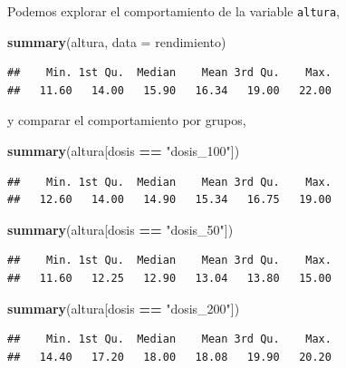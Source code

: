 \documentclass[
]{book}
\newenvironment{Shaded}{\begin{snugshade}}{\end{snugshade}}
\newcommand{\AttributeTok}[1]{\textcolor[rgb]{0.13,0.29,0.53}{#1}}
\newcommand{\FunctionTok}[1]{\textcolor[rgb]{0.13,0.29,0.53}{\textbf{#1}}}
\newcommand{\NormalTok}[1]{#1}
\newcommand{\SpecialCharTok}[1]{\textcolor[rgb]{0.81,0.36,0.00}{\textbf{#1}}}
\newcommand{\StringTok}[1]{\textcolor[rgb]{0.31,0.60,0.02}{#1}}
\begin{document}
Podemos explorar el comportamiento de la variable \texttt{altura},

\begin{Shaded}
\begin{Highlighting}[]
\FunctionTok{summary}\NormalTok{(altura, }\AttributeTok{data =}\NormalTok{ rendimiento)}
\end{Highlighting}
\end{Shaded}

\begin{verbatim}
##    Min. 1st Qu.  Median    Mean 3rd Qu.    Max. 
##   11.60   14.00   15.90   16.34   19.00   22.00
\end{verbatim}

y comparar el comportamiento por grupos,

\begin{Shaded}
\begin{Highlighting}[]
\FunctionTok{summary}\NormalTok{(altura[dosis }\SpecialCharTok{==} \StringTok{"dosis\_100"}\NormalTok{])}
\end{Highlighting}
\end{Shaded}

\begin{verbatim}
##    Min. 1st Qu.  Median    Mean 3rd Qu.    Max. 
##   12.60   14.00   14.90   15.34   16.75   19.00
\end{verbatim}

\begin{Shaded}
\begin{Highlighting}[]
\FunctionTok{summary}\NormalTok{(altura[dosis }\SpecialCharTok{==} \StringTok{"dosis\_50"}\NormalTok{])}
\end{Highlighting}
\end{Shaded}

\begin{verbatim}
##    Min. 1st Qu.  Median    Mean 3rd Qu.    Max. 
##   11.60   12.25   12.90   13.04   13.80   15.00
\end{verbatim}

\begin{Shaded}
\begin{Highlighting}[]
\FunctionTok{summary}\NormalTok{(altura[dosis }\SpecialCharTok{==} \StringTok{"dosis\_200"}\NormalTok{])}
\end{Highlighting}
\end{Shaded}

\begin{verbatim}
##    Min. 1st Qu.  Median    Mean 3rd Qu.    Max. 
##   14.40   17.20   18.00   18.08   19.90   20.20
\end{verbatim}
\end{document}
